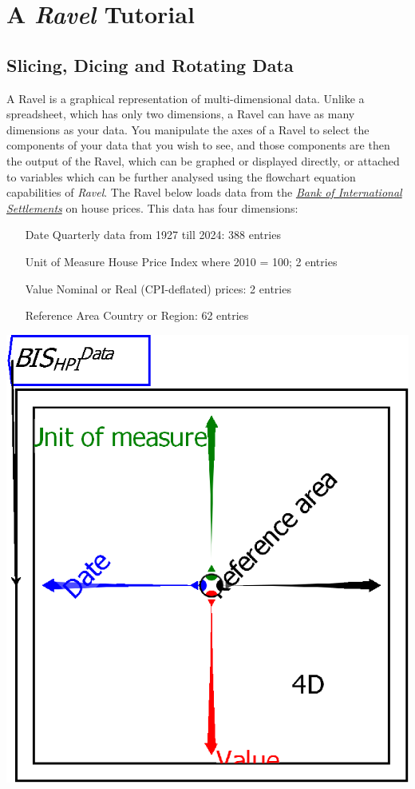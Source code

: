 
\chapter{A \emph{Ravel} Tutorial}

\label{tutorial}

\section{Slicing, Dicing and Rotating Data}

A Ravel is a graphical representation of multi-dimensional data. Unlike
a spreadsheet, which has only two dimensions, a Ravel can have as
many dimensions as your data. You manipulate the axes of a Ravel to
select the components of your data that you wish to see, and those
components are then the output of the Ravel, which can be graphed
or displayed directly, or attached to variables which can be further
analysed using the flowchart equation capabilities of \emph{Ravel}.
The Ravel below loads data from the \emph{\href{https://data.bis.org/bulkdownload}{Bank of International Settlements}}
on house prices. This data has four dimensions:
\begin{enumerate}
\item[Date] Quarterly data from 1927 till 2024: 388 entries 
\item[Unit of Measure] House Price Index where 2010 = 100; 2 entries 
\item[Value] Nominal or Real (CPI-deflated) prices: 2 entries 
\item[Reference Area] Country or Region: 62 entries 
\end{enumerate}
\includegraphics{images/tut00Ravel}

